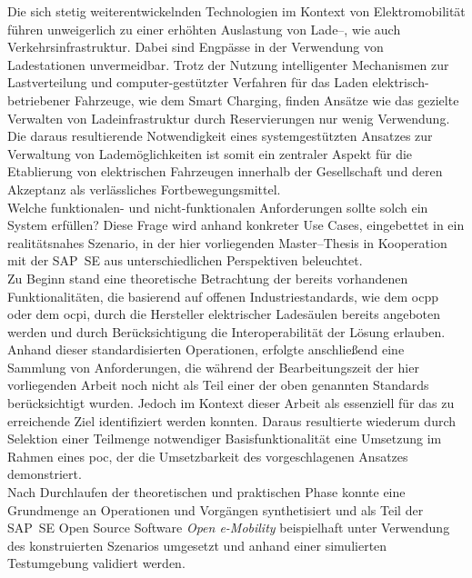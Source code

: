 
\Abstract
Die sich stetig weiterentwickelnden Technologien im Kontext von Elektromobilit\"at  f\"uhren unweigerlich zu einer erh\"ohten Auslastung von Lade--, wie auch Verkehrsinfrastruktur. Dabei sind Engp\"asse in der Verwendung von Ladestationen unvermeidbar. 
Trotz der Nutzung intelligenter Mechanismen zur Lastverteilung und computer-gest\"utzter Verfahren f\"ur das Laden elektrisch-betriebener Fahrzeuge, wie dem Smart Charging, finden Ans\"atze wie das gezielte Verwalten von Ladeinfrastruktur durch Reservierungen nur wenig Verwendung.
Die daraus resultierende Notwendigkeit eines systemgest\"utzten Ansatzes zur Verwaltung von Ladem\"oglichkeiten ist somit ein zentraler Aspekt f\"ur die Etablierung von elektrischen Fahrzeugen innerhalb der Gesellschaft und deren Akzeptanz als verl\"assliches Fortbewegungsmittel.\\
Welche funktionalen- und nicht-funktionalen Anforderungen sollte solch ein System erf\"ullen? Diese Frage wird anhand konkreter Use Cases, eingebettet in ein realitätsnahes Szenario, in der hier vorliegenden Master--Thesis in Kooperation mit der SAP~SE aus unterschiedlichen Perspektiven beleuchtet.\\
Zu Beginn stand eine theoretische Betrachtung der bereits vorhandenen Funktionalit\"aten, die basierend auf offenen Industriestandards, wie dem \acrfull{ocpp} oder dem \acrfull{ocpi}, durch die Hersteller elektrischer Lades\"aulen bereits angeboten werden und durch Ber\"ucksichtigung die Interoperabilit\"at der L\"osung erlauben.
Anhand dieser standardisierten Operationen, erfolgte anschließend eine Sammlung von Anforderungen, die w\"ahrend der Bearbeitungszeit der hier vorliegenden Arbeit noch nicht als Teil einer der oben genannten Standards ber\"ucksichtigt wurden. Jedoch im Kontext dieser Arbeit als essenziell f\"ur das zu erreichende Ziel identifiziert werden konnten.
Daraus resultierte wiederum durch Selektion einer Teilmenge notwendiger Basisfunktionalit\"at eine Umsetzung im Rahmen eines \acrfull{poc}, der die Umsetzbarkeit des vorgeschlagenen Ansatzes demonstriert.\\
Nach Durchlaufen der theoretischen und praktischen Phase konnte eine Grundmenge an Operationen und Vorg\"angen synthetisiert und als Teil der SAP~SE Open Source Software \textit{Open e-Mobility} beispielhaft unter Verwendung des konstruierten Szenarios umgesetzt und anhand einer simulierten Testumgebung validiert werden.
